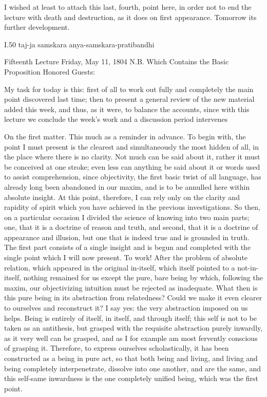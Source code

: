 I wished at least to attach this last, fourth, point here,
in order not to end the lecture with death and destruction,
as it does on first appearance.
Tomorrow its further development.

I.50
taj-ja samskara anya-samskara-pratibandhi

Fifteenth Lecture
Friday, May 11, 1804
N.B. Which Contains the Basic Proposition
Honored Guests:

My task for today is this:
first of all to work out fully and completely
the main point discovered last time;
then to present a general review of
the new material added this week,
and thus, as it were, to balance the accounts,
since with this lecture we conclude the week's work
and a discussion period intervenes

On the first matter.
This much as a reminder in advance.
To begin with, the point I must present is
the clearest and simultaneously the most hidden of all,
in the place where there is no clarity.
Not much can be said about it,
rather it must be conceived at one stroke;
even less can anything be said about it
or words used to assist comprehension,
since objectivity, the first basic twist of all language,
has already long been abandoned in our maxim,
and is to be annulled here within absolute insight.
At this point, therefore, I can rely only
on the clarity and rapidity of spirit
which you have achieved in the previous investigations.
So then, on a particular occasion I divided
the science of knowing into two main parts;
one, that it is a doctrine of reason and truth,
and second, that it is a doctrine of appearance and illusion,
but one that is indeed true and is grounded in truth.
The first part consists of a single insight and is begun
and completed with the single point which I will now present.
To work!
After the problem of absolute relation,
which appeared in the original in-itself,
which itself pointed to a not-in-itself,
nothing remained for us except
the pure, bare being by which, following the maxim,
our objectivizing intuition must be rejected as inadequate.
What then is this pure being in its abstraction from relatedness?
Could we make it even clearer to ourselves and reconstruct it?
I say yes: the very abstraction imposed on us helps.
Being is entirely of itself, in itself, and through itself;
this self is not to be taken as an antithesis,
but grasped with the requisite abstraction purely inwardly,
as it very well can be grasped,
and as I for example am most fervently conscious of grasping it.
Therefore, to express ourselves scholastically,
it has been constructed as a being in pure act,
so that both being and living, and living and being
completely interpenetrate, dissolve into one another,
and are the same, and this self-same inwardness is
the one completely unified being,
which was the first point.

